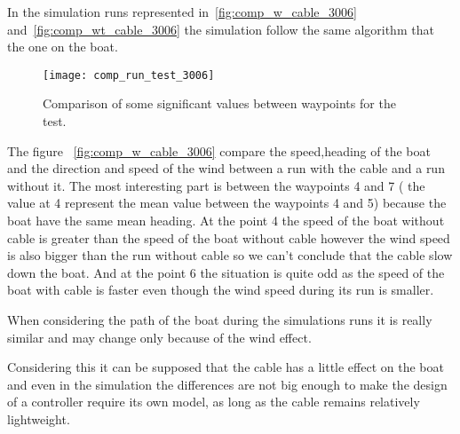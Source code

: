 In the simulation runs represented in~\ref{fig:comp_w_cable_3006} and~\ref{fig:comp_wt_cable_3006} the simulation follow the same algorithm that the one on the boat.

 \begin{figure}[H]
    \centering
    \texttt{[image: comp\_run\_test\_3006]}
    \caption{Comparison of some significant values between waypoints for the test.}
    \label{fig:comp_run_306}
\end{figure}

The figure ~\ref{fig:comp_w_cable_3006} compare the speed,heading of the boat and the direction and speed of the wind between a run with the cable and a run without it. The most interesting part is between the waypoints 4 and 7 ( the value at 4 represent the mean value between the waypoints 4 and 5)  because the boat have the same mean heading. At the point 4 the speed of the boat without cable is greater than the speed of the boat without cable however the wind speed is also bigger than the run without cable so we can't conclude that the cable slow down the boat. And at the point 6 the situation is quite odd as the speed of the boat with cable is faster 
even though the wind speed during its run is smaller.

When considering the path of the boat during the simulations runs it is really similar and may change only because of the wind effect.

Considering this it can be supposed that the cable has a little effect on the boat and even in the simulation the differences are not big enough to make the design of a controller require its own model, as long as the cable remains relatively lightweight.
	



 